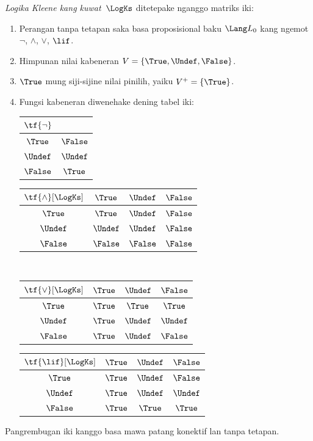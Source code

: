 \documentclass[../../../include/open-logic-section]{subfiles}
\begin{document}
\begin{defn}
\emph{Logika Kleene kang kuwat}~$\LogKs$ ditetepake nganggo matriks iki:
\begin{enumerate}
  \item Perangan tanpa tetapan saka basa proposisional baku
  $\Lang L_0$ kang ngemot $\lnot$, $\land$, $\lor$, $\lif$.
  \item Himpunan nilai kabeneran $V = \{\True, \Undef, \False\}$.
  \item $\True$ mung siji-sijine nilai pinilih, yaiku $V^+ = \{\True\}$.
  \item Fungsi kabeneran diwenehake dening tabel iki:
  \begin{center}
    \begin{tabular}{c|c} 
      $\tf{\lnot}$ & \\ 
      \hline  
      $\True$ & $\False$ \\ 
      $\Undef$ & $\Undef$ \\
      $\False$ & $\True$ 
    \end{tabular}
    \quad
    \begin{tabular}{c|ccc} 
      $\tf{\land}[\LogKs]$ & $\True$ & $\Undef$ & $\False$ \\ 
      \hline 
      $\True$ & $\True$ & $\Undef$ & $\False$ \\ 
      $\Undef$ & $\Undef$ & $\Undef$ & $\False$\\ 
      $\False$ & $\False$ & $\False$ & $\False$ 
    \end{tabular}
    \\[2ex]
    \begin{tabular}{c|ccc} 
      $\tf{\lor}[\LogKs]$ & $\True$ & $\Undef$ & $\False$ \\ 
      \hline 
      $\True$ & $\True$ & $\True$ & $\True$ \\ 
      $\Undef$ & $\True$ & $\Undef$ & $\Undef$ \\
      $\False$ & $\True$ & $\Undef$ & $\False$ 
    \end{tabular}
    \quad
    \begin{tabular}{c|ccc} 
      $\tf{\lif}[\LogKs]$ & $\True$ & $\Undef$ & $\False$ \\ 
      \hline 
      $\True$ & $\True$ & $\Undef$ & $\False$ \\ 
      $\Undef$ & $\True$ & $\Undef$ & $\Undef$  \\ 
      $\False$ & $\True$ & $\True$ & $\True$ 
    \end{tabular}
  \end{center} 
\end{enumerate}
Pangrembugan iki kanggo basa mawa patang konektif lan tanpa tetapan.
\end{defn}
\end{document}
